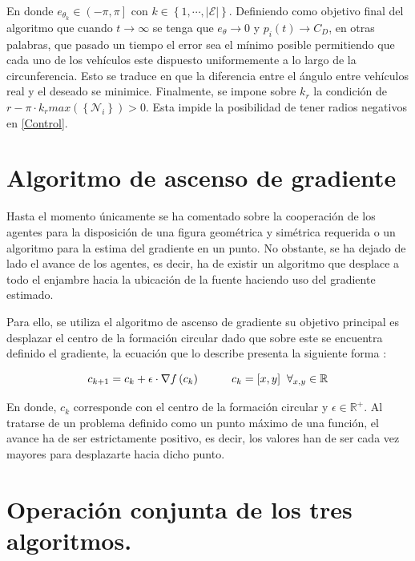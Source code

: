 En donde $e_{\theta_{k}}\in\left(-\pi,\pi\right]$ con $k\in\left\lbrace{1,\cdots,|\mathcal{E}|}\right\rbrace$. Definiendo como objetivo final del algoritmo que cuando $t\rightarrow\infty$ se tenga que $e_{\theta}\rightarrow{0}$ y $p_{i}\left(t\right)\rightarrow{C_D}$, en otras palabras, que pasado un tiempo el error sea el mínimo posible permitiendo que cada uno de los vehículos este dispuesto uniformemente a lo largo de la circunferencia. Esto se traduce en que la diferencia entre el ángulo entre vehículos real y el deseado se minimice. Finalmente, se impone sobre $k_{r}$ la condición de $r-\pi\cdot{k_{r}}max\left(\left\lbrace\mathcal{N}_{i}\right\rbrace\right)>0$. Esta impide la posibilidad de tener radios negativos en \ref{Control}.

\section{Algoritmo de ascenso de gradiente}

Hasta el momento únicamente se ha comentado sobre la cooperación de los agentes para la disposición de una figura geométrica y simétrica requerida o un algoritmo para la estima del gradiente en un punto. No obstante, se ha dejado de lado el avance de los agentes, es decir, ha de existir un algoritmo que desplace a todo el enjambre hacia la ubicación de la fuente haciendo uso del gradiente estimado.

Para ello, se utiliza el algoritmo de ascenso de gradiente su objetivo principal es desplazar el centro de la formación circular dado que sobre este se encuentra definido el gradiente, la ecuación que lo describe presenta la siguiente forma \cite{Adicional_Estimacion_1}:

\begin{equation}\label{GA}
	c_{k+1}=c_k+\epsilon\cdot\nabla{f}\left(c_k\right)\hspace{10mm}c_k=[x,y]\hspace{2mm}\forall_{x,y}\in\mathbb{R}
\end{equation}

En donde, $c_k$ corresponde con el centro de la formación circular y $\epsilon\in\mathbb{R}^{+}$. Al tratarse de un problema definido como un punto máximo de una función, el avance ha de ser estrictamente positivo, es decir, los valores han de ser cada vez mayores para desplazarte hacia dicho punto.

\section{Operación conjunta de los tres algoritmos.}

